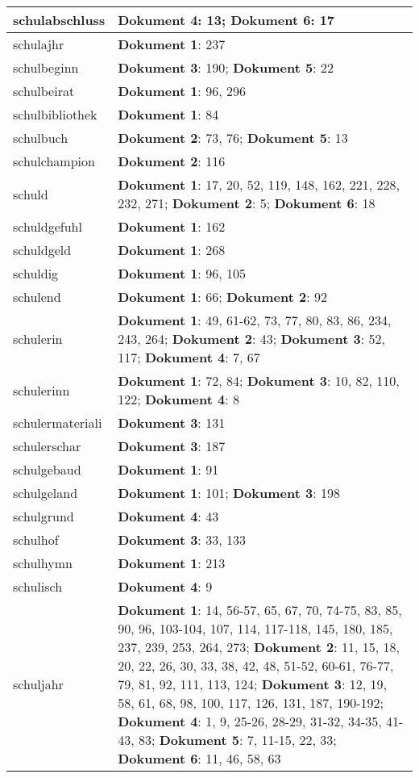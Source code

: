 \documentclass[a5paper]{article}
\begin{document}
\begin{longtable}[l]{|l|p{3in}|}
\hline
schulabschluss & \textbf{Dokument 4}: 13; \textbf{Dokument 6}: 17 \\
\hline
schulajhr & \textbf{Dokument 1}: 237 \\
\hline
schulbeginn & \textbf{Dokument 3}: 190; \textbf{Dokument 5}: 22 \\
\hline
schulbeirat & \textbf{Dokument 1}: 96, 296 \\
\hline
schulbibliothek & \textbf{Dokument 1}: 84 \\
\hline
schulbuch & \textbf{Dokument 2}: 73, 76; \textbf{Dokument 5}: 13 \\
\hline
schulchampion & \textbf{Dokument 2}: 116 \\
\hline
schuld & \textbf{Dokument 1}: 17, 20, 52, 119, 148, 162, 221, 228, 232, 271; \textbf{Dokument 2}: 5; \textbf{Dokument 6}: 18 \\
\hline
schuldgefuhl & \textbf{Dokument 1}: 162 \\
\hline
schuldgeld & \textbf{Dokument 1}: 268 \\
\hline
schuldig & \textbf{Dokument 1}: 96, 105 \\
\hline
schulend & \textbf{Dokument 1}: 66; \textbf{Dokument 2}: 92 \\
\hline
schulerin & \textbf{Dokument 1}: 49, 61-62, 73, 77, 80, 83, 86, 234, 243, 264; \textbf{Dokument 2}: 43; \textbf{Dokument 3}: 52, 117; \textbf{Dokument 4}: 7, 67 \\
\hline
schulerinn & \textbf{Dokument 1}: 72, 84; \textbf{Dokument 3}: 10, 82, 110, 122; \textbf{Dokument 4}: 8 \\
\hline
schulermateriali & \textbf{Dokument 3}: 131 \\
\hline
schulerschar & \textbf{Dokument 3}: 187 \\
\hline
schulgebaud & \textbf{Dokument 1}: 91 \\
\hline
schulgeland & \textbf{Dokument 1}: 101; \textbf{Dokument 3}: 198 \\
\hline
schulgrund & \textbf{Dokument 4}: 43 \\
\hline
schulhof & \textbf{Dokument 3}: 33, 133 \\
\hline
schulhymn & \textbf{Dokument 1}: 213 \\
\hline
schulisch & \textbf{Dokument 4}: 9 \\
\hline
schuljahr & \textbf{Dokument 1}: 14, 56-57, 65, 67, 70, 74-75, 83, 85, 90, 96, 103-104, 107, 114, 117-118, 145, 180, 185, 237, 239, 253, 264, 273; \textbf{Dokument 2}: 11, 15, 18, 20, 22, 26, 30, 33, 38, 42, 48, 51-52, 60-61, 76-77, 79, 81, 92, 111, 113, 124; \textbf{Dokument 3}: 12, 19, 58, 61, 68, 98, 100, 117, 126, 131, 187, 190-192; \textbf{Dokument 4}: 1, 9, 25-26, 28-29, 31-32, 34-35, 41-43, 83; \textbf{Dokument 5}: 7, 11-15, 22, 33; \textbf{Dokument 6}: 11, 46, 58, 63 \\

\end{longtable}
\end{document}

